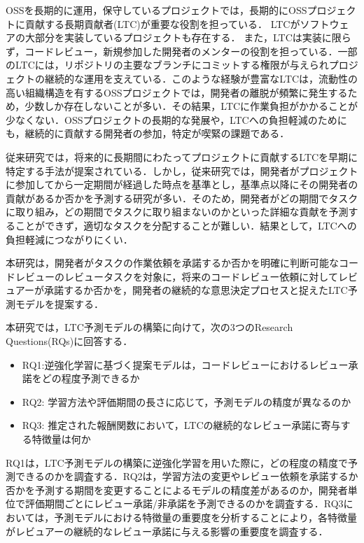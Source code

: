 \documentclass[11pt]{jreport}
\begin{document}
OSSを長期的に運用，保守しているプロジェクトでは，長期的にOSSプロジェクトに貢献する長期貢献者(LTC)が重要な役割を担っている\cite{related1}\cite{successful}．
LTCがソフトウェアの大部分を実装しているプロジェクトも存在する\cite{LTC}．
また，LTCは実装に限らず，コードレビュー，新規参加した開発者のメンターの役割を担っている．一部のLTCには，リポジトリの主要なブランチにコミットする権限が与えられプロジェクトの継続的な運用を支えている\cite{LTC}．このような経験が豊富なLTCは，流動性の高い組織構造を有するOSSプロジェクトでは，開発者の離脱が頻繁に発生するため，少数しか存在しないことが多い．その結果，LTCに作業負担がかかることが少なくない\cite{related2}．OSSプロジェクトの長期的な発展や，LTCへの負担軽減のためにも，継続的に貢献する開発者の参加，特定が喫緊の課題である．

従来研究では，将来的に長期間にわたってプロジェクトに貢献するLTCを早期に特定する手法が提案されている\cite{related1}\cite{LTC}．しかし，従来研究では，開発者がプロジェクトに参加してから一定期間が経過した時点を基準とし，基準点以降にその開発者の貢献があるか否かを予測する研究が多い．そのため，開発者がどの期間でタスクに取り組み，どの期間でタスクに取り組まないのかといった詳細な貢献を予測することができず，適切なタスクを分配することが難しい．結果として，LTCへの負担軽減につながりにくい．

本研究は，開発者がタスクの作業依頼を承諾するか否かを明確に判断可能なコードレビューのレビュータスクを対象に，将来のコードレビュー依頼に対してレビュアーが承諾するか否かを，開発者の継続的な意思決定プロセスと捉えたLTC予測モデルを提案する．

本研究では，LTC予測モデルの構築に向けて，次の3つのResearch Questions(RQs)に回答する．
\begin{itemize}
    \item RQ1:逆強化学習に基づく提案モデルは，コードレビューにおけるレビュー承諾をどの程度予測できるか
    \item RQ2: 学習方法や評価期間の長さに応じて，予測モデルの精度が異なるのか
    \item RQ3: 推定された報酬関数において，LTCの継続的なレビュー承諾に寄与する特徴量は何か
\end{itemize}
RQ1は，LTC予測モデルの構築に逆強化学習を用いた際に，どの程度の精度で予測できるのかを調査する．RQ2は，学習方法の変更やレビュー依頼を承諾するか否かを予測する期間を変更することによるモデルの精度差があるのか，開発者単位で評価期間ごとにレビュー承諾/非承諾を予測できるのかを調査する．RQ3においては，予測モデルにおける特徴量の重要度を分析することにより，各特徴量がレビュアーの継続的なレビュー承諾に与える影響の重要度を調査する．
\end{document}
